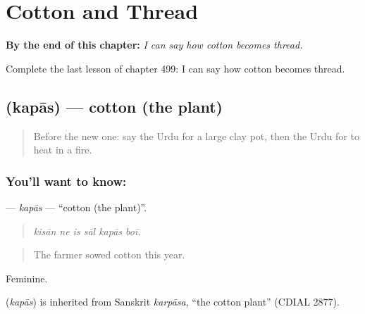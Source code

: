 
\chapter{Cotton and Thread}
\label{ch:ur-cotton-and-thread}

\begin{chapteropening}
\textbf{By the end of this chapter:} \emph{I can say how cotton becomes thread.}

Complete the last lesson of chapter 499: I can say how cotton becomes thread.
\end{chapteropening}

\section[\texorpdfstring{\ur{کپاس} (kapās)}{کپاس (kapās)}]{ (kapās) — cotton (the plant)}

\label{lesson:UR-C499-kapas}



\begin{quote}
Before the new one: say the Urdu for a large clay pot, then the Urdu for to heat in a fire.
\end{quote}

\subsection*{You'll want to know: }
\textbf{} — \emph{kapās} — \textquotedblleft{}cotton (the plant)\textquotedblright{}.

\begin{quote}
     
\end{quote}

\begin{quote}
\emph{kisān ne is sāl kapās boī.}
\end{quote}

\begin{quote}
The farmer sowed cotton this year.
\end{quote}

Feminine.

\begin{cousinweb}
\textbf{} (\emph{kapās}) is inherited from Sanskrit \emph{karpāsa}, \textquotedblleft{}the cotton plant\textquotedblright{} (CDIAL 2877).
\end{cousinweb}

